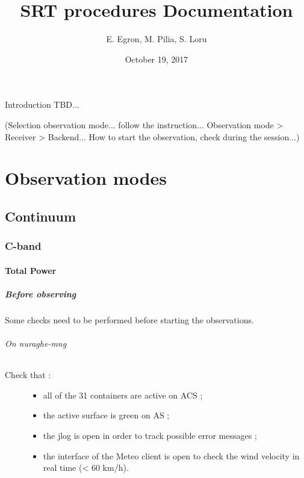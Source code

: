\documentclass[letterpaper,10pt,english]{sphinxmanual}
\title{SRT procedures Documentation}
\date{October 19, 2017}
\author{E. Egron, M. Pilia, S. Loru}
\begin{document}
\maketitle
\tableofcontents
{}\label{index::doc}


Introduction TBD...

(Selection observation mode... follow the instruction...
Observation mode \textgreater{} Receiver \textgreater{} Backend...
How to start the observation, check during the session...)


\chapter{Observation modes}
\label{index:observation-modes}\label{index:welcome-to-srt-procedure-documentation}

\section{Continuum}
\label{Continuum/index::doc}\label{Continuum/index:continuum}

\subsection{C-band}
\label{Continuum/C-band/index::doc}\label{Continuum/C-band/index:c-band}

\subsubsection{Total Power}
\label{Continuum/C-band/TP/index:total-power}\label{Continuum/C-band/TP/index::doc}

\paragraph{Before observing}
\label{Continuum/C-band/TP/before-obs:before-observing}\label{Continuum/C-band/TP/before-obs::doc}
Some checks need to be performed before starting the observations.


\subparagraph{On nuraghe-mng}
\label{Continuum/C-band/TP/before-obs:on-nuraghe-mng}\begin{description}
\item[{Check that :}] \leavevmode\begin{itemize}
\item {} 
all of the 31 containers are active on ACS ;

\item {} 
the active surface is green on AS ;

\item {} 
the jlog is open in order to track possible error messages ;

\item {} 
the interface of the Meteo client is open to check the wind velocity in real time (\textless{} 60 km/h).

\end{itemize}

\end{description}
\end{document}
